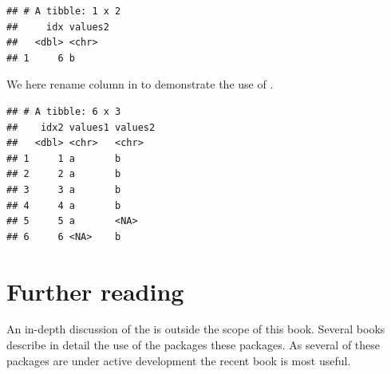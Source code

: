 \documentclass[krantz2]{krantz}\usepackage{knitr}%
\begin{document}
\begin{knitrout}\footnotesize
{}\color{fgcolor}\begin{kframe}
\begin{alltt}
\hlstd{(}   
\end{alltt}


{\ttfamily\noindent\itshape{}}\begin{verbatim}
## # A tibble: 1 x 2
##     idx values2
##   <dbl> <chr>  
## 1     6 b
\end{verbatim}
\end{kframe}
\end{knitrout}

We here rename column  in  to demonstrate the use of .

\begin{knitrout}\footnotesize
{}\color{fgcolor}\begin{kframe}
\begin{alltt}
 \hlkwb{<-}   
\hlstd{(}     \hlstd{=} \hlstd{(} \hlstd{=} \hlstd{))}
\end{alltt}
\begin{verbatim}
## # A tibble: 6 x 3
##    idx2 values1 values2
##   <dbl> <chr>   <chr>  
## 1     1 a       b      
## 2     2 a       b      
## 3     3 a       b      
## 4     4 a       b      
## 5     5 a       <NA>   
## 6     6 <NA>    b
\end{verbatim}
\end{kframe}
\end{knitrout}

\section{Further reading}
An in-depth discussion of the  is outside the scope of this book. Several books describe in detail the use of the packages these packages. As several of these packages are under active development the recent book  \autocite{Wickham2017} is most useful.
\end{document}
